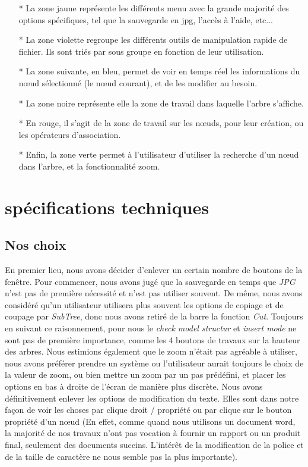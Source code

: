\documentclass[12pt, a4paper]{article}
\begin{document}
\begin{itemize}
\item [*]La zone jaune représente les différents menu avec la grande majorité des options spécifiques, tel que la sauvegarde en jpg, l'accès à l'aide, etc... 
\item [*]La zone violette regroupe les différents outils de manipulation rapide de fichier. Ils sont triés par sous groupe en fonction de leur utilisation. 
\item [*]La zone suivante, en bleu, permet de voir en temps réel les informations du nœud sélectionné (le nœud courant), et de les modifier au besoin. 
\item [*]La zone noire représente elle la zone de travail dans laquelle l'arbre s'affiche. 
\item [*]En rouge, il s'agit de la zone de travail sur les nœuds, pour leur création, ou les opérateurs d'association. 
\item [*]Enfin, la zone verte permet à l'utilisateur d'utiliser la recherche d'un nœud dans l'arbre, et la fonctionnalité zoom.
\end{itemize}

\section{spécifications techniques}

\subsection{Nos choix}

En premier lieu, nous avons décider d'enlever un certain nombre de boutons de la fenêtre. Pour commencer, nous avons jugé que la sauvegarde en temps que \emph{JPG} n'est pas de première nécessité et n'est pas utiliser souvent. De même, nous avons considéré qu'un utilisateur utilisera plus souvent les options de copiage et de coupage par \emph{SubTree}, donc nous avons retiré de la barre la fonction \emph{Cut}. Toujours en suivant ce raisonnement, pour nous le \emph{check model structur} et \emph{insert mode} ne sont pas de première importance, comme les 4 boutons de travaux sur la hauteur des arbres. Nous estimions également que le zoom n'était pas agréable à utiliser, nous avons préférer prendre un système ou l'utilisateur aurait toujours le choix de la valeur de zoom, ou bien mettre un zoom par un pas prédéfini, et placer les options en bas à droite de l'écran de manière plus discrète. Nous avons définitivement enlever les options de modification du texte. Elles sont dans notre façon de voir les choses par clique droit / propriété ou par clique sur le bouton propriété d'un nœud (En effet, comme quand nous utilisons un document word, la majorité de nos travaux n'ont pas vocation à fournir un rapport ou un produit final, seulement des documents succins. L’intérêt de la modification de la police et de la taille de caractère ne nous semble pas la plus importante).\\
\end{document}
